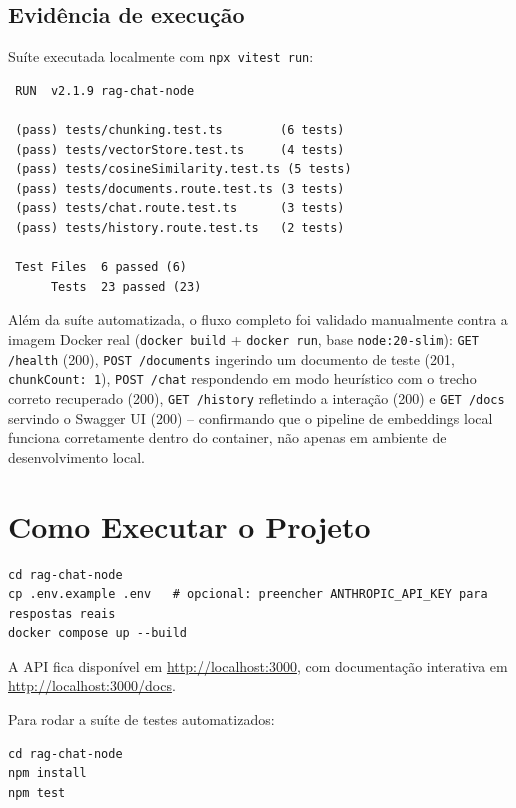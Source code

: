 \documentclass[11pt,a4paper]{article}
\begin{document}
\subsection{Evidência de execução}

Suíte executada localmente com \texttt{npx vitest run}:

\begin{lstlisting}
 RUN  v2.1.9 rag-chat-node

 (pass) tests/chunking.test.ts        (6 tests)
 (pass) tests/vectorStore.test.ts     (4 tests)
 (pass) tests/cosineSimilarity.test.ts (5 tests)
 (pass) tests/documents.route.test.ts (3 tests)
 (pass) tests/chat.route.test.ts      (3 tests)
 (pass) tests/history.route.test.ts   (2 tests)

 Test Files  6 passed (6)
      Tests  23 passed (23)
\end{lstlisting}

Além da suíte automatizada, o fluxo completo foi validado manualmente contra a
imagem Docker real (\texttt{docker build} + \texttt{docker run}, base
\texttt{node:20-slim}): \texttt{GET /health} (200), \texttt{POST /documents}
ingerindo um documento de teste (201, \texttt{chunkCount: 1}), \texttt{POST /chat}
respondendo em modo heurístico com o trecho correto recuperado (200),
\texttt{GET /history} refletindo a interação (200) e \texttt{GET /docs} servindo o
Swagger UI (200) -- confirmando que o pipeline de embeddings local funciona
corretamente dentro do container, não apenas em ambiente de desenvolvimento local.

\section{Como Executar o Projeto}

\begin{lstlisting}
cd rag-chat-node
cp .env.example .env   # opcional: preencher ANTHROPIC_API_KEY para respostas reais
docker compose up --build
\end{lstlisting}

A API fica disponível em \url{http://localhost:3000}, com documentação interativa
em \url{http://localhost:3000/docs}.

Para rodar a suíte de testes automatizados:

\begin{lstlisting}
cd rag-chat-node
npm install
npm test
\end{lstlisting}
\end{document}
